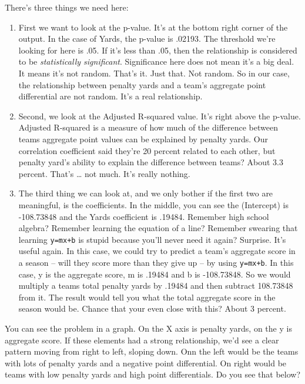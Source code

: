 \documentclass[]{book}
\providecommand{\tightlist}{%
  \setlength{\itemsep}{0pt}\setlength{\parskip}{0pt}}
\begin{document}
There's three things we need here:

\begin{enumerate}
\def\labelenumi{\arabic{enumi}.}
\tightlist
\item
  First we want to look at the p-value. It's at the bottom right corner
  of the output. In the case of Yards, the p-value is .02193. The
  threshold we're looking for here is .05. If it's less than .05, then
  the relationship is considered to be \emph{statistically significant}.
  Significance here does not mean it's a big deal. It means it's not
  random. That's it. Just that. Not random. So in our case, the
  relationship between penalty yards and a team's aggregate point
  differential are not random. It's a real relationship.
\item
  Second, we look at the Adjusted R-squared value. It's right above the
  p-value. Adjusted R-squared is a measure of how much of the difference
  between teams aggregate point values can be explained by penalty
  yards. Our correlation coefficient said they're 20 percent related to
  each other, but penalty yard's ability to explain the difference
  between teams? About 3.3 percent. That's \ldots{} not much. It's
  really nothing.
\item
  The third thing we can look at, and we only bother if the first two
  are meaningful, is the coefficients. In the middle, you can see the
  (Intercept) is -108.73848 and the Yards coefficient is .19484.
  Remember high school algebra? Remember learning the equation of a
  line? Remember swearing that learning \texttt{y=mx+b} is stupid
  because you'll never need it again? Surprise. It's useful again. In
  this case, we could try to predict a team's aggregate score in a
  season -- will they score more than they give up -- by using
  \texttt{y=mx+b}. In this case, y is the aggregate score, m is .19484
  and b is -108.73848. So we would multiply a teams total penalty yards
  by .19484 and then subtract 108.73848 from it. The result would tell
  you what the total aggregate score in the season would be. Chance that
  your even close with this? About 3 percent.
\end{enumerate}

You can see the problem in a graph. On the X axis is penalty yards, on
the y is aggregate score. If these elements had a strong relationship,
we'd see a clear pattern moving from right to left, sloping down. Onn
the left would be the teams with lots of penalty yards and a negative
point differential. On right would be teams with low penalty yards and
high point differentials. Do you see that below?
\end{document}
